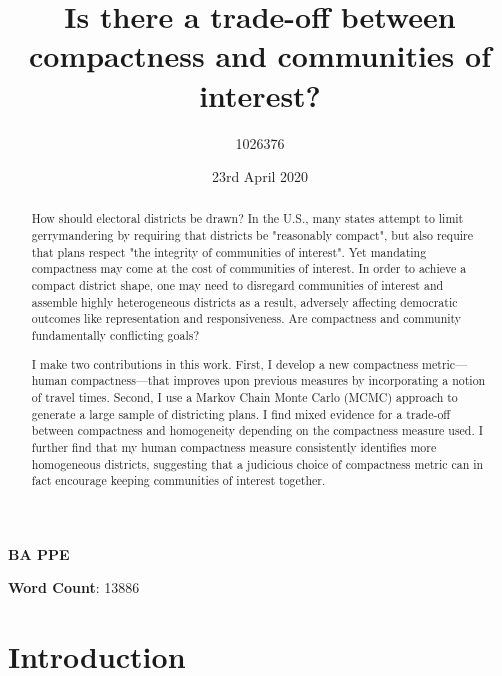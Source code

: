\documentclass[]{article}
\title{Is there a trade-off between compactness and communities of interest?}
\author{1026376}
\date{23rd April 2020}
\begin{document}
\maketitle

\def\citeapos#1{\citeauthor{#1}'s (\citeyear{#1})}

\begin{center}
\textbf{BA PPE}
\end{center}

\begin{abstract}
How should electoral districts be drawn? In the U.S.,
many states attempt to limit gerrymandering by requiring that districts be
"reasonably compact", but also require that plans respect "the integrity of
communities of interest". Yet mandating compactness may come at the cost
of communities of interest. In order to achieve a compact district shape, one
may need to disregard communities of interest and assemble highly heterogeneous
districts as a result, adversely affecting democratic outcomes like
representation and responsiveness. Are compactness and community fundamentally
conflicting goals?

I make two contributions in this work. First, I develop a new compactness
metric---human compactness---that improves upon previous measures by
incorporating a notion of travel times. Second, I use a Markov Chain Monte
Carlo (MCMC) approach to generate a large sample of districting plans. I find
mixed evidence for a trade-off between compactness and homogeneity depending on
the compactness measure used. I further find that my human compactness measure
consistently identifies more homogeneous districts, suggesting that a judicious
choice of compactness metric can in fact encourage keeping communities of
interest together.

\end{abstract}

\begin{center}
\textbf{Word Count}: 13886
\end{center}

\pagebreak{}

\tableofcontents{}

\pagebreak{}

\nocite{ggplot2} \nocite{stargazer}

\hypertarget{introduction}{%
\section{Introduction}\label{introduction}}
\end{document}
